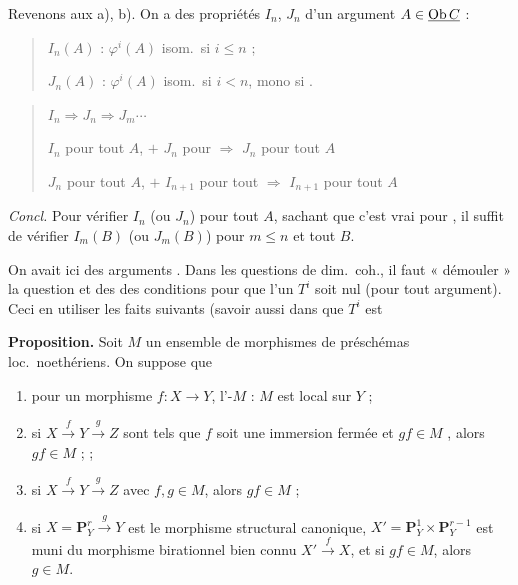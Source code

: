 \documentclass[11pt,a4paper]{article}
\begin{document}
Revenons aux a), b). On a des propriétés \struck{\ill{}} $I_n$, $J_n$ d'un
argument $A \in \uncertain{\mathrm{Ob}\, C}$ :
\begin{quote}
$I_n(A)$ : $\varphi^{i}(A)$ isom.\ si $i \leqslant n$ ;

$J_n(A)$ : $\varphi^{i}(A)$ isom.\ si $i < n$, mono si
.
\end{quote}
\begin{quote}
$I_n \Rightarrow J_n \Rightarrow J_m \cdots$

$I_n$ pour tout $A$, $+$ $J_n$ pour \ill{} $\Rightarrow$ $J_n$ pour tout $A$

$J_n$ pour tout $A$, $+$ $I_{n+1}$ pour tout \ill{} $\Rightarrow$ $I_{n+1}$
pour tout $A$
\end{quote}

\emph{Concl.} Pour vérifier $I_n$ (ou $J_n$) pour tout $A$, sachant que c'est
vrai pour \ill{} , il suffit de vérifier $I_m(B)$ (ou
$J_m(B)$) pour $m \leqslant n$ et tout \ill{} $B$.

On avait ici des arguments \ill{} \ill{}. Dans les questions de dim.\ coh.,
\ill{} il faut « démouler » la question et des \ill{} des conditions pour que
l'un $T^{i}$ soit nul (pour tout argument). Ceci en \ill{} utiliser les faits
suivants (savoir aussi dans \ill{} que $T^{i}$ est

 \textbf{Proposition.} Soit $M$ un ensemble de morphismes de
préschémas loc.\ noethériens. On suppose que
\begin{enumerate}
\item[a)] pour un morphisme $f : X \to Y$, l'\ill{}-$M$ \ill{} : $M$ est local
  sur $Y$ ;
\item[d)] si $X \xrightarrow{\ f\ } Y \xrightarrow{\ g\ } Z$ sont tels que $f$
  soit une immersion fermée et $gf \in M$ , alors
  $gf \in M$ ;  ;
\item[b)] si $X \xrightarrow{\ f\ } Y \xrightarrow{\ g\ } Z$ avec
  $f, g \in M$, alors $gf \in M$ ;
\item[c)] si $X = \mathbf{P}^{r}_{Y} \xrightarrow{\ g\ } Y$ est le morphisme
  structural canonique, 
  $X' = \mathbf{P}^{1}_{Y} \times \mathbf{P}^{r-1}_{Y}$ est muni du morphisme
  birationnel bien connu $X' \xrightarrow{\ f\ } X$, et si $gf \in M$, alors
  $g \in M$.
\end{enumerate}
\end{document}
